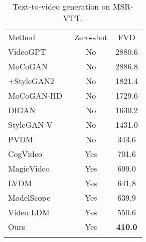 \documentclass{article}
\begin{document}
\begin{table}
    \begin{minipage}{.5\linewidth}
    \centering
      \caption{Text-to-video generation on UCF101.}
        \label{tab:result_ucf101}
        \vspace{0.5mm}
        \footnotesize
        \renewcommand{\arraystretch}{1.2}
        \begin{tabular}{lcc}
        \Xhline{1.2pt}
        Method       & Zero-shot & FVD    \\ 
        \Xhline{0.4pt}
        VideoGPT~\cite{yan2021videogpt}     & No        & 2880.6 \\
        MoCoGAN~\cite{2018MoCoGAN}      & No        & 2886.8 \\
        +StyleGAN2~\cite{viazovetskyi2020stylegan2}   & No        & 1821.4 \\
        MoCoGAN-HD~\cite{tian2021good_mocohd}   & No        & 1729.6 \\
        DIGAN~\cite{yu2022generating_digan}        & No        & 1630.2 \\
        StyleGAN-V~\cite{skorokhodov2022stylegan}   & No        & 1431.0 \\
        PVDM~\cite{PVDM}         & No        & 343.6  \\ 
        \Xhline{0.4pt}
        CogVideo~\cite{2023CogVideo}     & Yes       & 701.6  \\
        MagicVideo~\cite{zhou2022magicvideo}   & Yes       & 699.0  \\
        LVDM~\cite{he2022lvdm}   & Yes       & 641.8  \\
        ModelScope~\cite{VideoFusion}   & Yes       & 639.9  \\
        Video LDM~\cite{VideoLDM}    & Yes       & 550.6  \\ 
        \Xhline{0.4pt}
        Ours         & Yes       & \textbf{410.0}      \\ 
        \Xhline{1.2pt}
        \end{tabular}
    \end{minipage}
    \begin{minipage}{.5\linewidth}
        \centering
        \begin{minipage}{\textwidth}
        \vspace{0pt}
        \footnotesize
        \centering
            \caption{Text-to-video generation on MSR-VTT.}
            \label{tab:result_msrvtt}
            \vspace{0.5mm}
            \renewcommand{\arraystretch}{1.2}

\end{minipage}
\end{minipage}
\end{table}
\end{document}
